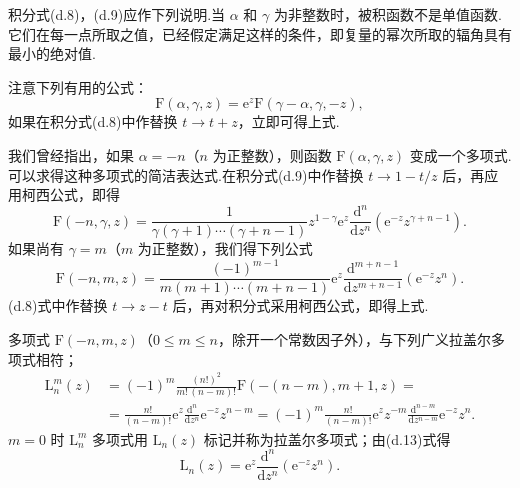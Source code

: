 积分式(d.8)，(d.9)应作下列说明.当 $\alpha$ 和 $\gamma$ 为非整数时，被积函数不是单值函数.它们在每一点所取之值，已经假定满足这样的条件，即复量的幂次所取的辐角具有最小的绝对值.

注意下列有用的公式：
\begin{equation}
  \mathrm{F}(\alpha,\gamma,z)=\mathrm{e}^z\mathrm{F}(\gamma-\alpha,\gamma,-z),
\end{equation}
如果在积分式(d.8)中作替换 $t\to t+z$，立即可得上式.

我们曾经指出，如果 $\alpha=-n$（$n$ 为正整数），则函数 $\mathrm{F}(\alpha,\gamma,z)$ 变成一个多项式.可以求得这种多项式的简洁表达式.在积分式(d.9)中作替换 $t\to 1-t/z$ 后，再应用柯西公式，即得
\begin{equation}
  \mathrm{F}(-n,\gamma,z)=\frac{1}{\gamma(\gamma+1)\cdots(\gamma+n-1)}
  z^{1-\gamma}\mathrm{e}^z\frac{\mathrm{d}^n}{\mathrm{d}z^n}
  \left(\mathrm{e}^{-z}z^{\gamma+n-1}\right).
\end{equation}
如果尚有 $\gamma=m$（$m$ 为正整数），我们得下列公式
\begin{equation}
  \mathrm{F}(-n,m,z)=\frac{(-1)^{m-1}}{m(m+1)\cdots(m+n-1)}
  \mathrm{e}^z\frac{\mathrm{d}^{m+n-1}}{\mathrm{d}z^{m+n-1}}
  \left(\mathrm{e}^{-z}z^n\right).
\end{equation}
(d.8)式中作替换 $t\to z-t$ 后，再对积分式采用柯西公式，即得上式.

多项式 $\mathrm{F}(-n,m,z)$（$0\leqslant m\leqslant n$，除开一个常数因子外），与下列广义拉盖尔多项式相符；
\begin{equation}
\begin{aligned}
  \mathrm{L}_n^m(z)&=(-1)^m\frac{(n!)^2}{m!\,(n-m)!}
  \mathrm{F}\left(-(n-m),m+1,z\right)=\\
  &=\frac{n!}{(n-m)!}\mathrm{e}^z\frac{\mathrm{d}^n}{\mathrm{d}z^n}\mathrm{e}^{-z}z^{n-m}
  =(-1)^m\frac{n!}{(n-m)!}\mathrm{e}^z z^{-m}
  \frac{\mathrm{d}^{n-m}}{\mathrm{d}z^{n-m}}\mathrm{e}^{-z}z^n.
\end{aligned}
\end{equation}
$m=0$ 时 $\mathrm{L}_n^m$ 多项式用 $\mathrm{L}_n(z)$ 标记并称为拉盖尔多项式；由(d.13)式得
\begin{equation*}
  \mathrm{L}_n(z)=\mathrm{e}^z\frac{\mathrm{d}^n}{\mathrm{d}z^n}
  \left(\mathrm{e}^{-z}z^n\right).
\end{equation*}

